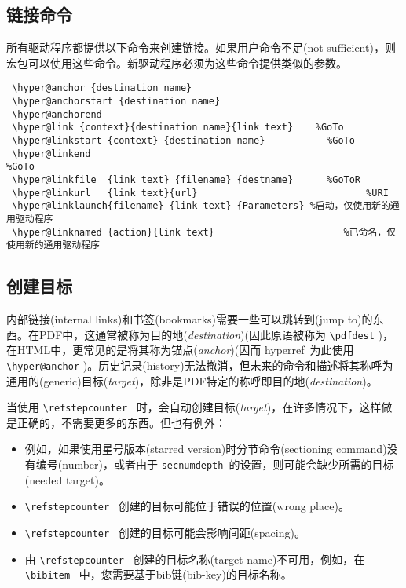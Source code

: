 \documentclass{article}
\newcommand*{\cs}[1]{%
  \texttt{\textbackslash #1}%
}
\newcommand*{\xpackage}[1]{\textsf{#1}}
\begin{document}
\subsection[链接命令]{\heiti 链接命令}
所有驱动程序都提供以下命令来创建链接。如果用户命令不足(not sufficient)，则宏包可以使用这些命令。新驱动程序必须为这些命令提供类似的参数。

\begin{verbatim}
 \hyper@anchor {destination name}
 \hyper@anchorstart {destination name}
 \hyper@anchorend
 \hyper@link {context}{destination name}{link text}    %GoTo
 \hyper@linkstart {context} {destination name}           %GoTo
 \hyper@linkend                                                     %GoTo
 \hyper@linkfile  {link text} {filename} {destname}      %GoToR
 \hyper@linkurl   {link text}{url}                              %URI
 \hyper@linklaunch{filename} {link text} {Parameters} %启动，仅使用新的通用驱动程序
 \hyper@linknamed {action}{link text}                       %已命名，仅使用新的通用驱动程序
\end{verbatim}

\subsection[创建目标]{\heiti 创建目标}

内部链接(internal links)和书签(bookmarks)需要一些可以跳转到(jump to)的东西。在PDF中，这通常被称为{\kaiti 目的地}(\emph{destination})(因此原语被称为 \cs{pdfdest})，在HTML中，更常见的是将其称为{\kaiti 锚点}(\emph{anchor})(因而 \xpackage{hyperref}\ 为此使用 \cs{hyper@anchor})。历史记录(history)无法撤消，但未来的命令和描述将其称呼为通用的(generic){\kaiti 目标}(\emph{target})，除非是PDF特定的称呼即{\kaiti 目的地}(\emph{destination})。

当使用 \cs{refstepcounter}\ 时，会自动创建{\kaiti 目标}(\emph{target})，在许多情况下，这样做是正确的，不需要更多的东西。但也有例外：
\begin{itemize}
    \item 例如，如果使用星号版本(starred version)时分节命令(sectioning command)没有编号(number)，或者由于 \texttt{secnumdepth}\ 的设置，则可能会缺少所需的目标(needed target)。
    \item \cs{refstepcounter}\ 创建的目标可能位于错误的位置(wrong place)。
    \item \cs{refstepcounter}\ 创建的目标可能会影响间距(spacing)。
    \item 由 \cs{refstepcounter}\ 创建的目标名称(target name)不可用，例如，在 \cs{bibitem}\ 中，您需要基于bib键(bib-key)的目标名称。
\end{itemize}
\end{document}
